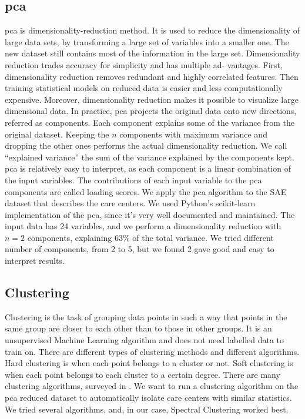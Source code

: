 \subsection{\acf{pca}}

\ac{pca} is dimensionality-reduction method. It is used to reduce the
dimensionality of large data sets, by transforming a large set of variables into
a smaller one. The new dataset still contains most of the information in the
large set. Dimensionality reduction trades accuracy for simplicity and has
multiple ad- vantages. First, dimensionality reduction removes redundant and
highly correlated features. Then training statistical models on reduced data is
easier and less computationally expensive. Moreover, dimensionality reduction
makes it possible to visualize large dimensional data. In practice, \ac{pca}
projects the original data onto new directions, referred as components. Each
component explains some of the variance from the original dataset. Keeping the
$n$ components with maximum variance and dropping the other ones performs the
actual dimensionality reduction. We call ``explained variance'' the sum of the
variance explained by the components kept. \ac{pca} is relatively easy to
interpret, as each component is a linear combination of the input variables. The
contributions of each input variable to the \ac{pca} components are called
loading scores. We apply the \ac{pca} algorithm to the SAE dataset that
describes the care centers. We used Python's scikit-learn
\cite{pedregosa_scikit-learn_2011} implementation of the \ac{pca}, since it's
very well documented and maintained. The input data has 24 variables, and we
perform a dimensionality reduction with $n=2$ components, explaining 63\% of the
total variance. We tried different number of components, from 2 to 5, but we
found 2 gave good and easy to interpret results.
\subsection{Clustering}

Clustering is the task of grouping data points in such a way that points in the
same group are closer to each other than to those in other groups. It is an
unsupervised Machine Learning algorithm and does not need labelled data to train
on. There are different types of clustering methods and different algorithms.
Hard clustering is when each point belongs to a cluster or not. Soft clustering
is when each point belongs to each cluster to a certain degree. There are many
clustering algorithms, surveyed in \cite{xu_comprehensive_2015}. We want to run
a clustering algorithm on the \ac{pca} reduced dataset to automatically isolate
care centers with similar statistics. We tried several algorithms, and, in our
case, Spectral Clustering \cite{luxburg_tutorial_2007} worked best.

